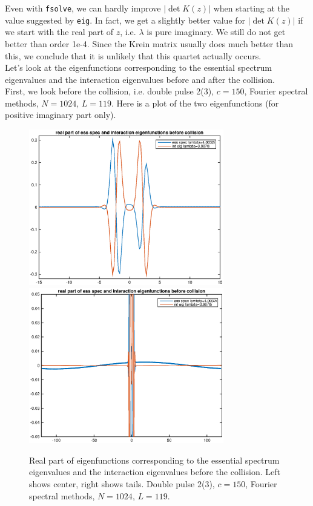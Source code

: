 \documentclass[12pt]{article}
\begin{document}
Even with \texttt{fsolve}, we can hardly improve $|\det K(z)|$ when starting at the value suggested by \texttt{eig}. In fact, we get a slightly better value for $|\det K(z)|$ if we start with the real part of $z$, i.e. $\lambda$ is pure imaginary. We still do not get better than order 1e-4. Since the Krein matrix usually does much better than this, we conclude that it is unlikely that this quartet actually occurs.\\

Let's look at the eigenfunctions corresponding to the essential spectrum eigenvalues and the interaction eigenvalues before and after the collision.\\

First, we look before the collision, i.e. double pulse 2(3), $c = 150$, Fourier spectral methods, $N = 1024$, $L = 119$. Here is a plot of the two eigenfunctions (for positive imaginary part only).

\begin{figure}[H]
	\includegraphics[width=8.5cm]{eigbeforecollision1.eps}
	\includegraphics[width=8.5cm]{eigbeforecollision2.eps}
	\caption{Real part of eigenfunctions corresponding to the essential spectrum eigenvalues and the interaction eigenvalues before the collision. Left shows center, right shows tails. Double pulse 2(3), $c = 150$, Fourier spectral methods, $N = 1024$, $L = 119$. }
\end{figure}
\end{document}
